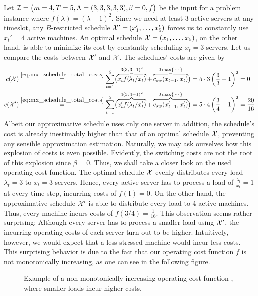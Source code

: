 \begin{exmpl}
Let $\mathcal{I}=\bigl(m=4,T=5,\Lambda=(3,3,3,3,3),\beta=0,f\bigr)$ be the input for a problem instance where $f(\lambda)=(\lambda-1)^2$. Since we need at least 3 active servers at any timeslot, any $B$-restricted schedule $\mathcal{X}'=(x_1',\dotsc,x_5')$ forces us to constantly use $x_t'=4$ active machines. An optimal schedule $\mathcal{X}=(x_1,\dotsc,x_5)$, on the other hand, is able to minimize its cost by constantly scheduling $x_t=3$ servers. Let us compare the costs between $\mathcal{X}'$ and $\mathcal{X}$. The schedules' costs are given by
\begin{align*}
	c(\mathcal{X})&\stackrel{\eqref{eq:mx_schedule_total_costs}}{=}\sum\limits_{t=1}^{5}\bigl(\overbrace{x_tf(\lambda_t/x_t)}^{3(3/3-1)^2}+\overbrace{c_{sw}(x_{t-1},x_t)}^{0\max\{\,\cdots\}}\bigr)=5\cdot3\left(\frac{3}{3}-1\right)^2=0\\
	c(\mathcal{X}')&\stackrel{\eqref{eq:mx_schedule_total_costs}}{=}\sum\limits_{t=1}^{5}\bigl(\overbrace{x_t'f(\lambda_t/x_t')}^{4(3/4-1)^2}+\overbrace{c_{sw}(x_{t-1}',x_t')}^{0\max\{\,\cdots\}}\bigr)=5\cdot4\left(\frac{3}{4}-1\right)^2=\frac{20}{16} 
\end{align*}
Albeit our approximative schedule uses only one server in addition, the schedule's cost is already inestimably higher than that of an optimal schedule $\mathcal{X}$, preventing any sensible approximation estimation. Naturally, we may ask ourselves how this explosion of costs is even possible. Evidently, the switching costs are not the root of this explosion since $\beta=0$. Thus, we shall take a closer look on the used operating cost function. The optimal schedule $\mathcal{X}$ evenly distributes every load $\lambda_t=3$ to $x_t=3$ servers. Hence, every active server has to process a load of $\frac{\lambda_t}{x_t}=1$ at every time step, incurring costs of $f(1)=0$. On the other hand, the approximative schedule $\mathcal{X}'$ is able to distribute every load to 4 active machines. Thus, every machine incurs costs of $f(3/4)=\frac{1}{16}$. This observation seems rather surprising: Although every server has to process a smaller load using $\mathcal{X}'$, the incurring operating costs of each server turn out to be higher. Intuitively, however, we would expect that a less stressed machine would incur less costs. This surprising behavior is due to the fact that our operating cost function $f$ is not monotonically increasing, as one can see in the following figure.
\begin{figure}[H]
\centering

\caption{Example of a non monotonically increasing operating cost function , where smaller loads incur higher costs.}
\label{fig:non_mono_incr_f}
\end{figure}
\end{exmpl}
